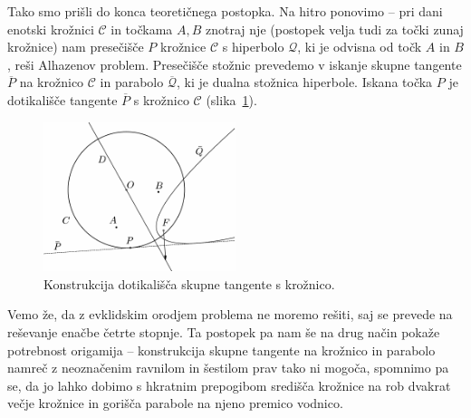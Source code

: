 Tako smo prišli do konca teoretičnega postopka. Na hitro ponovimo -- pri dani enotski krožnici $\mathcal{C}$ in točkama $A, B$ znotraj nje (postopek velja tudi za točki zunaj krožnice) nam presečišče $P$ krožnice $\mathcal{C}$ s hiperbolo $\mathcal{Q}$, ki je odvisna od točk $A$ in $B$, reši Alhazenov problem. Presečišče stožnic prevedemo v iskanje skupne tangente $\overline{P}$ na krožnico $\mathcal{C}$ in parabolo $\mathcal{\overline{Q}}$, ki je dualna stožnica hiperbole. Iskana točka $P$ je dotikališče tangente $\overline{P}$ s krožnico $\mathcal{C}$ (slika~\ref{fig:nishimura_resitev}).

\begin{figure}[h]
    \centering
    \includegraphics[width=0.5\textwidth]{images/alhazen/nishimura_resitev.png}
    \caption[Nishimurijeva rešitev]{Konstrukcija dotikališča skupne tangente s krožnico.}
    \label{fig:nishimura_resitev}
\end{figure}

Vemo že, da z evklidskim orodjem problema ne moremo rešiti, saj se prevede na reševanje enačbe četrte stopnje. Ta postopek pa nam še na drug način pokaže potrebnost origamija -- konstrukcija skupne tangente na krožnico in parabolo namreč z neoznačenim ravnilom in šestilom prav tako ni mogoča, spomnimo pa se, da jo lahko dobimo s hkratnim prepogibom središča krožnice na rob dvakrat večje krožnice in gorišča parabole na njeno premico vodnico.

